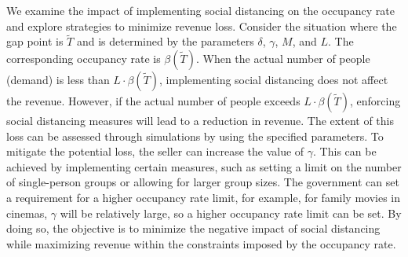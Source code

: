 We examine the impact of implementing social distancing on the occupancy rate and explore strategies to minimize revenue loss. Consider the situation where the gap point is $\tilde{T}$ and is determined by the parameters $\delta$, $\gamma$, $M$, and $L$. The corresponding occupancy rate is $\beta(\tilde{T})$. When the actual number of people (demand) is less than $L \cdot \beta(\tilde{T})$, implementing social distancing does not affect the revenue. However, if the actual number of people exceeds $L \cdot \beta(\tilde{T})$, enforcing social distancing measures will lead to a reduction in revenue. The extent of this loss can be assessed through simulations by using the specified parameters. To mitigate the potential loss, the seller can increase the value of $\gamma$. This can be achieved by implementing certain measures, such as setting a limit on the number of single-person groups or allowing for larger group sizes. The government can set a requirement for a higher occupancy rate limit, for example, for family movies in cinemas, $\gamma$ will be relatively large, so a higher occupancy rate limit can be set. By doing so, the objective is to minimize the negative impact of social distancing while maximizing revenue within the constraints imposed by the occupancy rate.